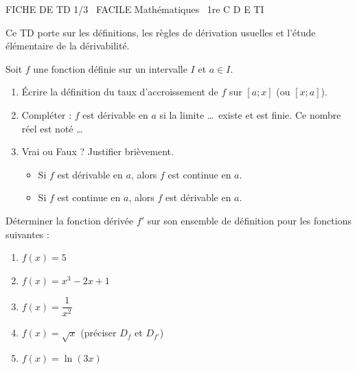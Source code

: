 \documentclass[11pt]{article}
\begin{document}
\begin{tcolorbox}[enhanced,colback=popink,colframe=popink,arc=10pt,boxrule=0pt,left=12pt,right=12pt,top=9pt,bottom=9pt]
{\color{white}\popxbold\small FICHE DE TD 1/3 \textbullet\ FACILE \hfill Mathématiques \textbullet\ 1re C D E TI\par}
\end{tcolorbox}
\vspace{4pt}
Ce TD porte sur les définitions, les règles de dérivation usuelles et l'étude élémentaire de la dérivabilité.

\begin{exercice}
Soit $f$ une fonction définie sur un intervalle $I$ et $a \in I$.
\begin{enumerate}
    \item Écrire la définition du taux d'accroissement de $f$ sur $[a;x]$ (ou $[x;a]$).
    \item Compléter : $f$ est dérivable en $a$ si la limite \ldots\ existe et est finie. Ce nombre réel est noté \ldots
    \item Vrai ou Faux ? Justifier brièvement.
    \begin{itemize}
        \item Si $f$ est dérivable en $a$, alors $f$ est continue en $a$.
        \item Si $f$ est continue en $a$, alors $f$ est dérivable en $a$.
    \end{itemize}
\end{enumerate}
\end{exercice}

\begin{exercice}
Déterminer la fonction dérivée $f'$ sur son ensemble de définition pour les fonctions suivantes :
\begin{enumerate}
    \item $f(x) = 5$
    \item $f(x) = x^3 - 2x + 1$
    \item $f(x) = \dfrac{1}{x^2}$
    \item $f(x) = \sqrt{x}$ (préciser $D_f$ et $D_{f'}$)
    \item $f(x) = \ln(3x)$
\end{enumerate}
\end{exercice}
\end{document}
